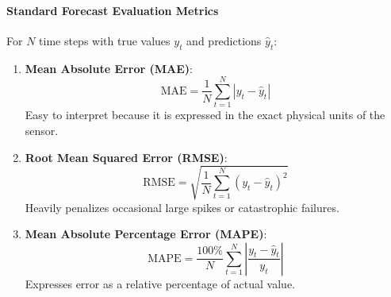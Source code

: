 \paragraph{Standard Forecast Evaluation Metrics}
For $N$ time steps with true values $y_t$ and predictions $\hat{y}_t$:
\begin{enumerate}
    \item \textbf{Mean Absolute Error (MAE)}:
    \begin{equation}
    \text{MAE} = \frac{1}{N} \sum_{t=1}^N |y_t - \hat{y}_t|\label{eq:mae_ts}
    \end{equation}
    Easy to interpret because it is expressed in the exact physical units of the sensor.

    \item \textbf{Root Mean Squared Error (RMSE)}:
    \begin{equation}
    \text{RMSE} = \sqrt{\frac{1}{N} \sum_{t=1}^N (y_t - \hat{y}_t)^2}\label{eq:rmse_ts}
    \end{equation}
    Heavily penalizes occasional large spikes or catastrophic failures.

    \item \textbf{Mean Absolute Percentage Error (MAPE)}:
    \begin{equation}
    \text{MAPE} = \frac{100\%}{N} \sum_{t=1}^N \left| \frac{y_t - \hat{y}_t}{y_t} \right|\label{eq:mape_ts}
    \end{equation}
    Expresses error as a relative percentage of actual value.
\end{enumerate}

